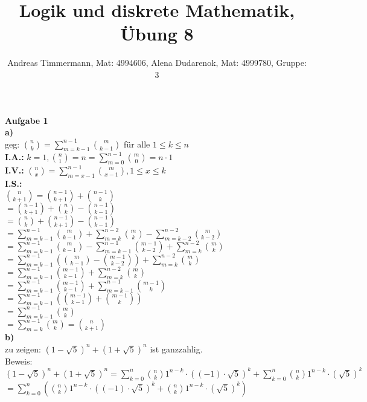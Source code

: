 \documentclass[a4paper]{scrartcl}
\title{Logik und diskrete Mathematik, Übung 8}
\author{Andreas Timmermann, Mat: 4994606, Alena Dudarenok, Mat: 4999780, Gruppe: 3}
\begin{document}
	\maketitle
	\begin{flushleft}
		\textbf{Aufgabe 1}\\
		\textbf{a)}\\
		geg: $\binom{n}{k} = \sum\limits_{m=k-1}^{n-1}\binom{m}{k-1}$ für alle $1\le k\le n$\\
		\textbf{I.A.:} $k=1, \binom{n}{1} = n = \sum\limits_{m=0}^{n-1}\binom{m}{0} = n\cdot 1$\\
		\textbf{I.V.:} $\binom{n}{x} = \sum\limits_{m=x-1}^{n-1}\binom{m}{x-1}, 1\le x\le k$\\
		\textbf{I.S.:} \\
		$\binom{n}{k+1} = \binom{n-1}{k+1}+\binom{n-1}{k}$\\
		$= \binom{n-1}{k+1}+\binom{n}{k}-\binom{n-1}{k-1}$\\
		$= \binom{n}{k}+\binom{n-1}{k+1}-\binom{n-1}{k-1}$\\
		$= \sum\limits_{m=k-1}^{n-1}\binom{m}{k-1} + \sum\limits_{m=k}^{n-2}\binom{m}{k} -  \sum\limits_{m=k-2}^{n-2}\binom{m}{k-2}$\\
		$= \sum\limits_{m=k-1}^{n-1}\binom{m}{k-1} -  \sum\limits_{m=k-1}^{n-1}\binom{m-1}{k-2} + \sum\limits_{m=k}^{n-2}\binom{m}{k}$\\
		$= \sum\limits_{m=k-1}^{n-1}(\binom{m}{k-1} - \binom{m-1}{k-2}) + \sum\limits_{m=k}^{n-2}\binom{m}{k}$\\
		$= \sum\limits_{m=k-1}^{n-1}\binom{m-1}{k-1} + \sum\limits_{m=k}^{n-2}\binom{m}{k}$\\
		$= \sum\limits_{m=k-1}^{n-1}\binom{m-1}{k-1} + \sum\limits_{m=k-1}^{n-1}\binom{m-1}{k}$\\
		$= \sum\limits_{m=k-1}^{n-1}(\binom{m-1}{k-1} + \binom{m-1}{k})$\\
		$= \sum\limits_{m=k-1}^{n-1}\binom{m}{k}$\\
		$= \sum\limits_{m=k}^{n-1}\binom{m}{k}= \binom{n}{k+1}$\\[1em]
		\textbf{b)}\\
		zu zeigen: $(1-\sqrt{5})^n + (1+\sqrt{5})^n$ ist ganzzahlig.\\
		Beweis:\\
		$(1-\sqrt{5})^n + (1+\sqrt{5})^n = \sum\limits_{k=0}^{n}\binom{n}{k}1^{n-k}\cdot ((-1)\cdot \sqrt{5})^k + \sum\limits_{k=0}^{n}\binom{n}{k}1^{n-k}\cdot (\sqrt{5})^k$\\
		$= \sum\limits_{k=0}^{n}(\binom{n}{k}1^{n-k}\cdot ((-1)\cdot \sqrt{5})^k + \binom{n}{k}1^{n-k}\cdot (\sqrt{5})^k)$\\

\end{flushleft}
\end{document}

